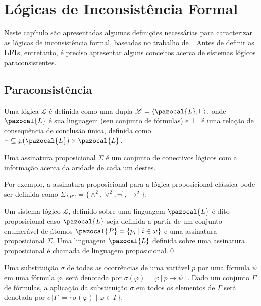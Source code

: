 \chapter{Lógicas de Inconsistência Formal}
\label{cap:LFIs}
Neste capítulo são apresentadas algumas definições necessárias para caracterizar as lógicas de inconsistência formal, baseadas no trabalho de~. Antes de definir as \textbf{LFI}s, entretanto, é preciso apresentar alguns conceitos acerca de sistemas lógicos paraconsistentes.

\section{Paraconsistência}
\label{sec:paracons}
Uma lógica $\mathcal{L}$ é definida como uma dupla $\mathcal{L} = \langle \pazocal{L},\vdash \rangle$, onde $\pazocal{L}$ é sua linguagem (seu conjunto de fórmulas) e $\vdash$ é uma relação de consequência de conclusão única, definida como $\vdash \;\subseteq \wp(\pazocal{L})\times\pazocal{L}$.

\begin{definicao}
    \label{def:ass_prop}
    Uma assinatura proposicional $\Sigma$ é um conjunto de conectivos lógicos com a informação acerca da aridade de cada um destes.
\end{definicao}
    Por exemplo, a assinatura proposicional para a lógica proposicional clássica pode ser definida como $\Sigma_{LPC} = \{\land^{2}, \lor^{2}, \neg^{1}, \rightarrow^{2}\}$.

\begin{definicao}
    \label{def:proposicional}
    Um sistema lógico $\mathcal{L}$, definido sobre uma linguagem $\pazocal{L}$ é dito proposicional caso $\pazocal{L}$ seja definida a partir de um conjunto enumerável de átomos $\pazocal{P} = \{p_{i} \;| \; i \in \omega \}$ e uma assinatura proposicional $\Sigma$. Uma linguagem $\pazocal{L}$ definida sobre uma assinatura proposicional é chamada de linguagem proposicional.\qed{}
\end{definicao}
\begin{notacao}[Substituição]
Uma substituição $\sigma$ de todas as ocorrências de uma variável $p$ por uma fórmula $\psi$ em uma fórmula $\varphi$, será denotada por $\sigma(\varphi) = \varphi[p \mapsto \psi]$. Dado um conjunto $\Gamma$ de fórmulas, a aplicação da substituição $\sigma$ em todos os elementos de $\Gamma$ será denotada por $\sigma|\Gamma| = \{\sigma(\varphi) \; | \; \varphi \in \Gamma\}$. 
\end{notacao}

